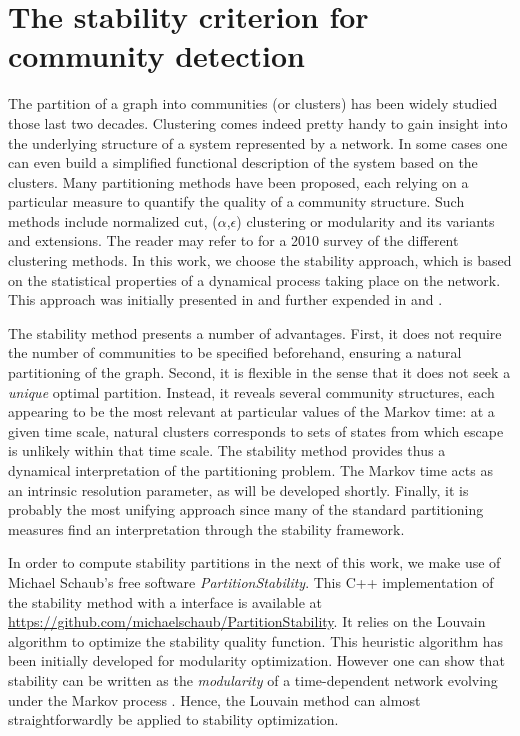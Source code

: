 \chapter{The stability criterion for community detection} \label{chap:clustering}
The partition of a graph into communities (or clusters) has been widely studied those last two decades. Clustering comes indeed pretty handy to gain insight into the underlying structure of a system represented by a network. In some cases one can even build a simplified functional description of the system based on the clusters. Many partitioning methods have been proposed, each relying on a particular measure to quantify the quality of a community structure. Such methods include normalized cut, ($\alpha$,$\epsilon$) clustering or modularity and its variants and extensions. The reader may refer to \cite{fortunato2010community} for a 2010 survey of the different clustering methods. In this work, we choose the stability approach, which is based on the statistical properties of a dynamical process taking place on the network. This approach was initially presented in \cite{delvenne2010stability} and further expended in \cite{lambiotte2009laplacian} and \cite{delvenne2013stability}. 

The stability method presents a number of advantages. First, it does not require the number of communities to be specified beforehand, ensuring a natural partitioning of the graph. Second, it is flexible in the sense that it does not seek a \textit{unique} optimal partition. Instead, it reveals several community structures, each appearing to be the most relevant at particular values of the Markov time: at a given time scale, natural clusters corresponds to sets of states from which escape is unlikely within that time scale. The stability method provides thus a dynamical interpretation of the partitioning problem. The Markov time acts as an intrinsic resolution parameter, as will be developed shortly. Finally, it is probably the most unifying approach since many of the standard partitioning measures find an interpretation through the stability framework.

In order to compute stability partitions in the next of this work, we make use of Michael Schaub's free software \textit{PartitionStability}. This C++ implementation of the stability method with a \matlab interface is available at \url{https://github.com/michaelschaub/PartitionStability}. It relies on the Louvain algorithm \cite{blondel2008fast} to optimize the stability quality function. This heuristic algorithm has been initially developed for modularity optimization. However one can show that stability can be written as the \textit{modularity} of a time-dependent network evolving under the Markov process \cite{lambiotte2009laplacian}. Hence, the Louvain method can almost straightforwardly be applied to stability optimization.

